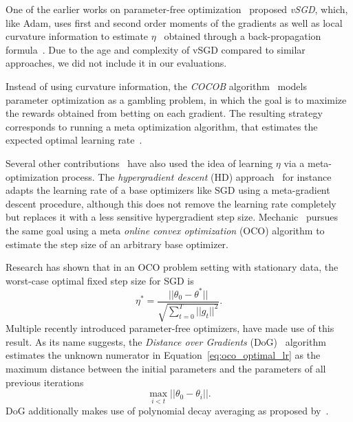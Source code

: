 \documentclass[runningheads]{llncs}
\begin{document}
One of the earlier works on parameter-free optimization~\cite{schaulNoMorePesky2013} proposed \textit{vSGD}, which, like Adam, uses first and second order moments of the gradients as well as local curvature information to estimate $\eta$~\cite{schaulNoMorePesky2013} obtained through a back-propagation formula~\cite{schaulNoMorePesky2013}.
Due to the age and complexity of vSGD compared to similar approaches, we did not include it in our evaluations.

Instead of using curvature information, the \textit{COCOB} algorithm~\cite{orabonaTrainingDeepNetworks2017} models parameter optimization as a gambling problem, in which the goal is to maximize the rewards obtained from betting on each gradient.
The resulting strategy corresponds to running a meta optimization algorithm, that estimates the expected optimal learning rate~\cite{orabonaTrainingDeepNetworks2017}.

Several other contributions~\cite{vanervenMetaGradMultipleLearning2016a,baydinOnlineLearningRate2018,cutkoskyMechanicLearningRate2023} have also used the idea of learning $\eta$ via a meta-optimization process.
The \textit{hypergradient descent} (HD) approach~\cite{baydinOnlineLearningRate2018} for instance adapts the learning rate of a base optimizers like SGD using a meta-gradient descent procedure, although this does not remove the learning rate completely but replaces it with a less sensitive hypergradient step size.
Mechanic~\cite{cutkoskyMechanicLearningRate2023} pursues the same goal using a meta \textit{online convex optimization} (OCO) algorithm to estimate the step size of an arbitrary base optimizer.

Research has shown that in an OCO problem setting with stationary data, the worst-case optimal fixed step size for SGD is
\begin{equation}\label{eq:oco_optimal_lr}
	\eta^* = \frac{||\theta_0 - \theta^*||}{\sqrt{\sum_{t=0}^{T} ||g_t||^2}}.
\end{equation}
Multiple recently introduced parameter-free optimizers, have made use of this result.
As its name suggests, the \textit{Distance over Gradients} (DoG)~\cite{ivgiDoGSGDBest2023} algorithm estimates the unknown numerator in Equation~\ref{eq:oco_optimal_lr} as the maximum distance between the initial parameters and the parameters of all previous iterations
\begin{equation}
	\max_{i<t}||\theta_0 - \theta_i||.
\end{equation}
DoG additionally makes use of polynomial decay averaging as proposed by~\textcite{shamirStochasticGradientDescent2012}.
\end{document}
